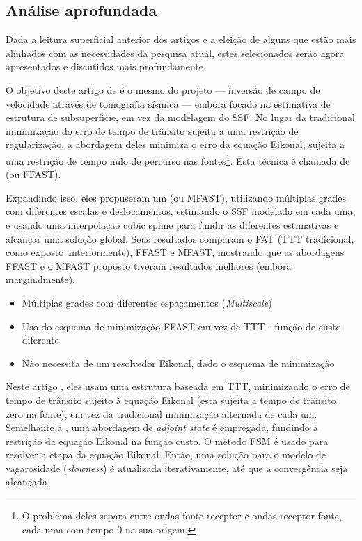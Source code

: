 \subsection{Análise aprofundada}
\label{sec_rt:subsec_deeper-analysis}

Dada a leitura superficial anterior dos artigos e a eleição de alguns que estão mais alinhados com as necessidades da pesquisa atual, estes selecionados serão agora apresentados e discutidos mais profundamente.


O objetivo deste artigo de \cite{li_multiscale_2024} é o mesmo do projeto --- inversão de campo de velocidade através de tomografia sísmica --- embora focado na estimativa de estrutura de subsuperfície, em vez da modelagem do SSF. No lugar da tradicional minimização do erro de tempo de trânsito sujeita a uma restrição de regularização, a abordagem deles minimiza o erro da equação Eikonal, sujeita a uma restrição de tempo nulo de percurso nas fontes\footnote{O problema deles separa entre ondas fonte-receptor e ondas receptor-fonte, cada uma com tempo $0$ na sua origem.}. Esta técnica é chamada de  (ou FFAST).

Expandindo isso, eles propuseram um  (ou MFAST), utilizando múltiplas grades com diferentes escalas e deslocamentos, estimando o SSF modelado em cada uma, e usando uma interpolação cubic spline para fundir as diferentes estimativas e alcançar uma solução global. Seus resultados comparam o FAT (TTT tradicional, como exposto anteriormente), FFAST e MFAST, mostrando que as abordagens FFAST e o MFAST proposto tiveram resultados melhores (embora marginalmente).

\begin{itemize}
	\item Múltiplas grades com diferentes espaçamentos (\textsl{Multiscale})
	\item Uso do esquema de minimização FFAST em vez de TTT - função de custo diferente
	\item Não necessita de um resolvedor Eikonal, dado o esquema de minimização
\end{itemize}


Neste artigo \cite{shin_distributed_2022}, eles usam uma estrutura baseada em TTT, minimizando o erro de tempo de trânsito sujeito à equação Eikonal (esta sujeita a tempo de trânsito zero na fonte), em vez da tradicional minimização alternada de cada um. Semelhante a \cite{li_multiscale_2024}, uma abordagem de \textsl{adjoint state} é empregada, fundindo a restrição da equação Eikonal na função custo. O método FSM é usado para resolver a etapa da equação Eikonal. Então, uma solução para o modelo de vagarosidade (\textsl{slowness}) é atualizada iterativamente, até que a convergência seja alcançada.

